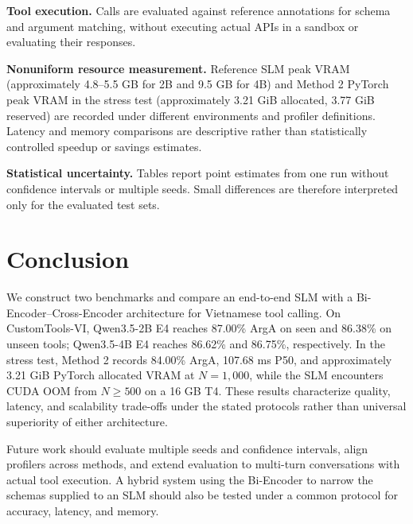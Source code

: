\documentclass[10pt,twocolumn,a4paper]{article}
\begin{document}
\textbf{Tool execution.} Calls are evaluated against reference annotations for schema and argument matching, without executing actual APIs in a sandbox or evaluating their responses.

\textbf{Nonuniform resource measurement.} Reference SLM peak VRAM (approximately 4.8--5.5 GB for 2B and 9.5 GB for 4B) and Method 2 PyTorch peak VRAM in the stress test (approximately 3.21 GiB allocated, 3.77 GiB reserved) are recorded under different environments and profiler definitions. Latency and memory comparisons are descriptive rather than statistically controlled speedup or savings estimates.

\textbf{Statistical uncertainty.} Tables report point estimates from one run without confidence intervals or multiple seeds. Small differences are therefore interpreted only for the evaluated test sets.

\section{Conclusion}
We construct two benchmarks and compare an end-to-end SLM with a Bi-Encoder--Cross-Encoder architecture for Vietnamese tool calling. On CustomTools-VI, Qwen3.5-2B E4 reaches 87.00\% ArgA on seen and 86.38\% on unseen tools; Qwen3.5-4B E4 reaches 86.62\% and 86.75\%, respectively. In the stress test, Method 2 records 84.00\% ArgA, 107.68 ms P50, and approximately 3.21 GiB PyTorch allocated VRAM at $N=1{,}000$, while the SLM encounters CUDA OOM from $N\geq500$ on a 16 GB T4. These results characterize quality, latency, and scalability trade-offs under the stated protocols rather than universal superiority of either architecture.

Future work should evaluate multiple seeds and confidence intervals, align profilers across methods, and extend evaluation to multi-turn conversations with actual tool execution. A hybrid system using the Bi-Encoder to narrow the schemas supplied to an SLM should also be tested under a common protocol for accuracy, latency, and memory.



\end{document}
